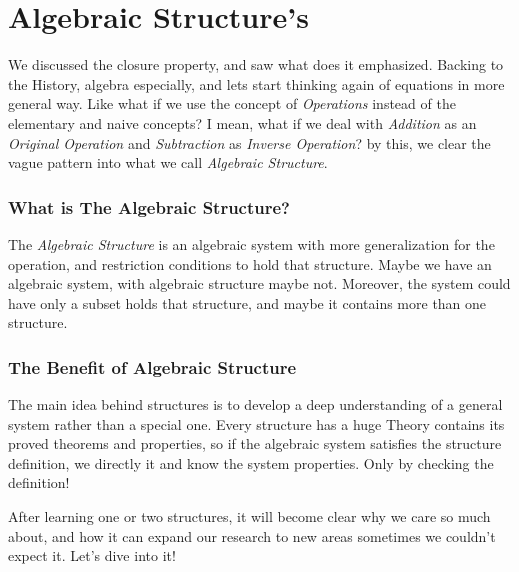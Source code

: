\section{Algebraic Structure's}
We discussed the closure property, and saw what does it emphasized. Backing to the History, algebra especially, and lets start thinking again of equations in more general way. Like what if we use the concept of {\it Operations} instead of the elementary and naive concepts? I mean, what if we deal with {\it Addition} as an {\it Original Operation} and {\it Subtraction} as {\it Inverse Operation}? by this, we clear the vague pattern into what we call {\it Algebraic Structure}.

\subsubsection{What is The Algebraic Structure?}
The {\it Algebraic Structure} is an algebraic system with more generalization for the operation, and restriction conditions to hold that structure. Maybe we have an algebraic system, with algebraic structure maybe not. Moreover, the system could have only a subset holds that structure, and maybe it contains more than one structure.

\subsubsection{The Benefit of Algebraic Structure}
The main idea behind structures is to develop a deep understanding of a general system rather than a special one. Every structure has a huge Theory contains its proved theorems and properties, so if the algebraic system satisfies the structure definition, we directly it and know the system properties. Only by checking the definition!

After learning one or two structures, it will become clear why we care so much about, and how it can expand our research to new areas sometimes we couldn't expect it. Let's dive into it!